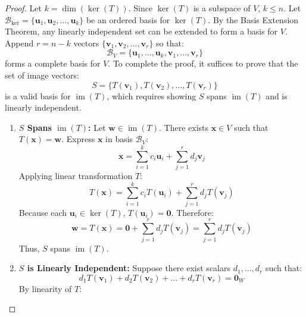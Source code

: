 \begin{proof}
Let $k = \dim(\ker(T))$. Since $\ker(T)$ is a subspace of $V$, $k \le n$.
Let $\mathcal{B}_{\ker} = \{\mathbf{u}_1, \mathbf{u}_2, \dots, \mathbf{u}_k\}$ be an ordered basis for $\ker(T)$.
By the Basis Extension Theorem, any linearly independent set can be extended to form a basis for $V$. Append $r = n - k$ vectors $\{\mathbf{v}_1, \mathbf{v}_2, \dots, \mathbf{v}_r\}$ so that:
\begin{equation*}
\mathcal{B}_V = \{\mathbf{u}_1, \dots, \mathbf{u}_k, \mathbf{v}_1, \dots, \mathbf{v}_r\}
\end{equation*}
forms a complete basis for $V$. To complete the proof, it suffices to prove that the set of image vectors:
\begin{equation*}
S = \{T(\mathbf{v}_1), T(\mathbf{v}_2), \dots, T(\mathbf{v}_r)\}
\end{equation*}
is a valid basis for $\operatorname{im}(T)$, which requires showing $S$ spans $\operatorname{im}(T)$ and is linearly independent.
\begin{enumerate}
    \item \textbf{$S$ Spans $\operatorname{im}(T)$:} Let $\mathbf{w} \in \operatorname{im}(T)$. There exists $\mathbf{x} \in V$ such that $T(\mathbf{x}) = \mathbf{w}$. Express $\mathbf{x}$ in basis $\mathcal{B}_V$:
    \begin{equation*}
    \mathbf{x} = \sum_{i=1}^k c_i \mathbf{u}_i + \sum_{j=1}^r d_j \mathbf{v}_j
    \end{equation*}
    Applying linear transformation $T$:
    \begin{equation*}
    T(\mathbf{x}) = \sum_{i=1}^k c_i T(\mathbf{u}_i) + \sum_{j=1}^r d_j T(\mathbf{v}_j)
    \end{equation*}
    Because each $\mathbf{u}_i \in \ker(T)$, $T(\mathbf{u}_i) = \mathbf{0}$. Therefore:
    \begin{equation*}
    \mathbf{w} = T(\mathbf{x}) = \mathbf{0} + \sum_{j=1}^r d_j T(\mathbf{v}_j) = \sum_{j=1}^r d_j T(\mathbf{v}_j)
    \end{equation*}
    Thus, $S$ spans $\operatorname{im}(T)$.
    \item \textbf{$S$ is Linearly Independent:} Suppose there exist scalars $d_1, \dots, d_r$ such that:
    \begin{equation*}
    d_1 T(\mathbf{v}_1) + d_2 T(\mathbf{v}_2) + \dots + d_r T(\mathbf{v}_r) = \mathbf{0}_W
    \end{equation*}
    By linearity of $T$:
    \begin{equation*}

\end{equation*}
\end{enumerate}
\end{proof}
